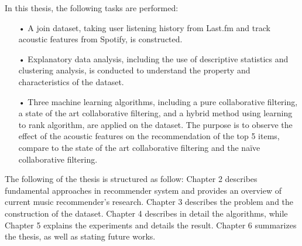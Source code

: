 In this thesis, the following tasks are performed: 

\begin{itemize}
   \item[•] A join dataset, taking user listening history from Last.fm and track acoustic features from Spotify, is constructed. 
	\item[•] Explanatory data analysis, including the use of descriptive statistics and clustering analysis, is conducted to understand the property and characteristics of the dataset.
	\item[•] Three machine learning algorithms, including a pure collaborative filtering, a state of the art collaborative filtering, and a hybrid method using learning to rank algorithm, are applied on the dataset. The purpose is to observe the effect of the acoustic features on the recommendation of the top 5 items, compare to the state of the art collaborative filtering and the na\"ive collaborative filtering.
\end{itemize}


The following of the thesis is structured as follow: Chapter 2 describes fundamental approaches in recommender system and provides an overview of current music recommender's research. Chapter 3 describes the problem and the construction of the dataset. Chapter 4 describes in detail the algorithms, while Chapter 5 explains the experiments and details the result. Chapter 6 summarizes the thesis, as well as stating future works.




